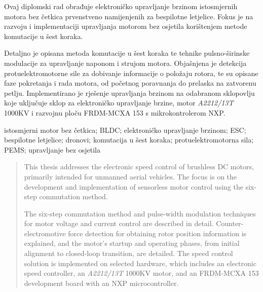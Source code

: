 \documentclass[diplomskirad]{fer}
\begin{document}




\begin{sazetak}

	Ovaj diplomski rad obrađuje elektroničko upravljanje brzinom istosmjernih
	motora bez četkica prvenstveno namijenjenih za bespilotne letjelice. Fokus je
	na razvoju i implementaciji upravljanja motorom bez osjetila korištenjem metode
	komutacije u šest koraka.

	Detaljno je opisana metoda komutacije u šest koraka te tehnike pulsno-širinske
	modulacije za upravljanje naponom i strujom motora. Objašnjena je detekcija
	protuelektromotorne sile za dobivanje informacije o položaju rotora, te su
	opisane faze pokretanja i rada motora, od početnog poravnanja do prelaska na
	zatvorenu petlju. Implementirano je rješenje upravljanja brzinom na odabranom
	sklopovlju koje uključuje sklop za elektroničko upravljanje brzine, motor
	\textit{ A2212/13T } 1000KV i razvojnu ploču FRDM-MCXA 153 s mikrokontrolerom
	NXP.
\end{sazetak}

\begin{kljucnerijeci}
	istosmjerni motor bez četkica; BLDC; elektroničko upravljanje brzinom; ESC; bespilotne letjelice; dronovi; komutacija u šest koraka; protuelektromotorna sila; PEMS; upravljanje bez osjetila
\end{kljucnerijeci}

\begin{abstract}

	This thesis addresses the electronic speed control of brushless DC motors,
	primarily intended for unmanned aerial vehicles. The focus is on the
	development and implementation of sensorless motor control using the six-step
	commutation method.

	The six-step commutation method and pulse-width modulation techniques for motor
	voltage and current control are described in detail. Counter-electromotive
	force detection for obtaining rotor position information is explained, and the
	motor's startup and operating phases, from initial alignment to closed-loop
	transition, are detailed. The speed control solution is implemented on selected
	hardware, which includes an electronic speed controller, an \textit{ A2212/13T
	} 1000KV motor, and an FRDM-MCXA 153 development board with an NXP
	microcontroller.
\end{abstract}
\end{document}
